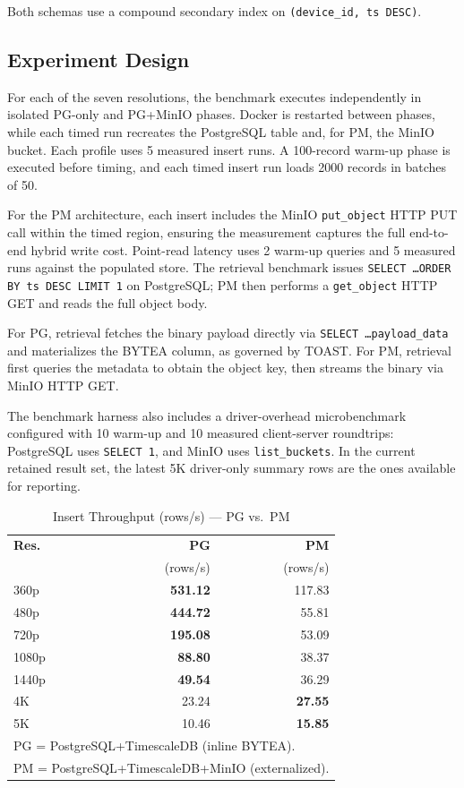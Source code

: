 \documentclass[conference]{IEEEtran}
\begin{document}
Both schemas use a compound secondary index on \texttt{(device\_id, ts DESC)}.

\subsection{Experiment Design}
For each of the seven resolutions, the benchmark executes independently in isolated PG-only and PG+MinIO phases. Docker is restarted between phases, while each timed run recreates the PostgreSQL table and, for PM, the MinIO bucket. Each profile uses 5 measured insert runs. A 100-record warm-up phase is executed before timing, and each timed insert run loads 2000 records in batches of 50.

For the PM architecture, each insert includes the MinIO \texttt{put\_object} HTTP PUT call within the timed region, ensuring the measurement captures the full end-to-end hybrid write cost. Point-read latency uses 2 warm-up queries and 5 measured runs against the populated store. The retrieval benchmark issues \texttt{SELECT \ldots ORDER BY ts DESC LIMIT 1} on PostgreSQL; PM then performs a \texttt{get\_object} HTTP GET and reads the full object body.

For PG, retrieval fetches the binary payload directly via \texttt{SELECT \ldots payload\_data} and materializes the BYTEA column, as governed by TOAST. For PM, retrieval first queries the metadata to obtain the object key, then streams the binary via MinIO HTTP GET.

The benchmark harness also includes a driver-overhead microbenchmark configured with 10 warm-up and 10 measured client-server roundtrips: PostgreSQL uses \texttt{SELECT 1}, and MinIO uses \texttt{list\_buckets}. In the current retained result set, the latest 5K driver-only summary rows are the ones available for reporting.


\begin{table}[htbp]
\centering
\renewcommand{\arraystretch}{1.15}
\caption{Insert Throughput (rows/s) --- PG vs.\ PM}
\label{tab:insert_summary}
\begin{tabular}{l r r}
\hline
\textbf{Res.} & \textbf{PG} & \textbf{PM} \\
 & (rows/s) & (rows/s) \\
\hline
360p  & \textbf{531.12} & 117.83 \\
480p  & \textbf{444.72} & 55.81 \\
720p  & \textbf{195.08} & 53.09 \\
1080p & \textbf{88.80} & 38.37 \\
1440p & \textbf{49.54} & 36.29 \\
4K    & 23.24  & \textbf{27.55} \\
5K    & 10.46  & \textbf{15.85} \\
\hline
\multicolumn{3}{l}{\footnotesize PG = PostgreSQL+TimescaleDB (inline BYTEA).} \\
\multicolumn{3}{l}{\footnotesize PM = PostgreSQL+TimescaleDB+MinIO (externalized).} \\
\end{tabular}
\end{table}
\end{document}
